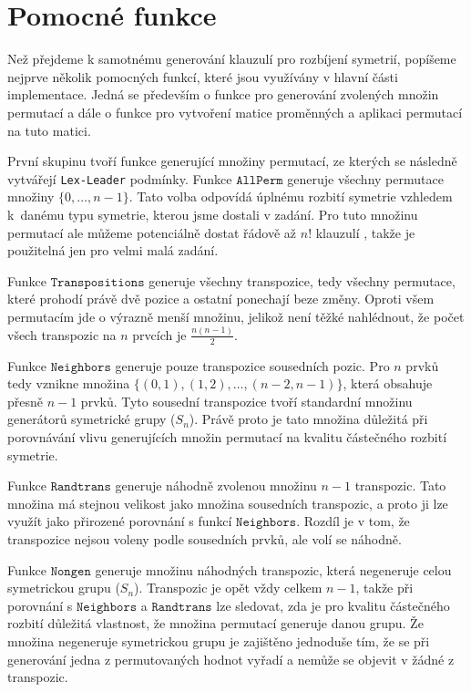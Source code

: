 \section{Pomocné funkce}
Než přejdeme k samotnému generování klauzulí pro rozbíjení symetrií, popíšeme nejprve několik pomocných funkcí, které jsou využívány v hlavní části implementace. Jedná se především o funkce pro generování zvolených množin permutací a dále o funkce pro vytvoření matice proměnných a aplikaci permutací na tuto matici.

První skupinu tvoří funkce generující množiny permutací, ze kterých se následně vytvářejí \texttt{Lex-Leader} podmínky. Funkce $\texttt{AllPerm}$ generuje všechny permutace množiny $\{0,\ldots,n-1\}$. Tato volba odpovídá úplnému rozbití symetrie vzhledem k danému typu symetrie, kterou jsme dostali v zadání. Pro tuto množinu permutací ale můžeme potenciálně dostat řádově až $n!$ klauzulí \cite{haken85}, takže je použitelná jen pro velmi malá zadání.

Funkce $\texttt{Transpositions}$ generuje všechny transpozice, tedy všechny permutace, které prohodí právě dvě pozice a ostatní ponechají beze změny. Oproti všem permutacím jde o výrazně menší množinu, jelikož není těžké nahlédnout, že počet všech transpozic na $n$ prvcích je $\frac{n(n-1)}{2}$.

Funkce $\texttt{Neighbors}$ generuje pouze transpozice sousedních pozic. Pro $n$ prvků tedy vznikne množina
$\{(0,1), (1,2), \ldots, (n-2,n-1)\}$, která obsahuje přesně $n-1$ prvků. Tyto sousední transpozice tvoří standardní množinu generátorů symetrické grupy ($S_n$). Právě proto je tato množina důležitá při porovnávání vlivu generujících množin permutací na kvalitu částečného rozbití symetrie.

Funkce $\texttt{Randtrans}$ generuje náhodně zvolenou množinu $n-1$ transpozic. Tato množina má stejnou velikost jako množina sousedních transpozic, a proto ji lze využít jako přirozené porovnání s funkcí $\texttt{Neighbors}$. Rozdíl je v tom, že transpozice nejsou voleny podle sousedních prvků, ale volí se náhodně.

Funkce $\texttt{Nongen}$ generuje množinu náhodných transpozic, která negeneruje celou symetrickou grupu ($S_n$). Transpozic je opět vždy celkem $n-1$, takže při porovnání s $\texttt{Neighbors}$ a $\texttt{Randtrans}$ lze sledovat, zda je pro kvalitu částečného rozbití důležitá vlastnost, že množina permutací generuje danou grupu. Že množina negeneruje symetrickou grupu je zajištěno jednoduše tím, že se při generování jedna z permutovaných hodnot vyřadí a nemůže se objevit v žádné z transpozic.

